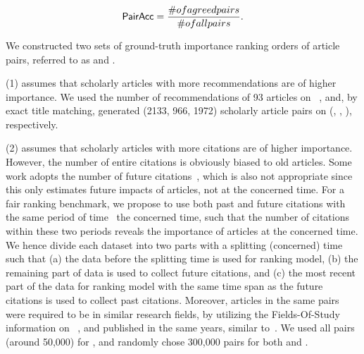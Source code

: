 \vspace{-1ex}
\begin{small}
\begin{equation}
\label{eq-metric}
\PairAcc=\frac{\#\mbox{ of agreed pairs}}{\# \mbox{ of all pairs}}.
\end{equation}
\end{small}
\vspace{-2ex}

We constructed two sets of ground-truth importance ranking orders of article pairs, referred to as  \recom and \fcita.


\noindent
(1) \recom assumes that scholarly articles with more recommendations are of higher importance.
%
We used the number of recommendations of 93 articles on \aan~\cite{Liang16AAAI}, %
and, by exact title matching, %
generated (2133, 966, 1972) scholarly article pairs on (\aan, \aminer, \magdata), respectively.


\noindent
(2) \fcita assumes that scholarly articles with more citations are of higher importance.
%
However, the number of entire citations is obviously biased to old articles. Some work adopts the number of future citations~\cite{Wang13AAAI,Wang16TIST,Li08TSRanking}, which is also not appropriate since this only estimates future impacts of articles, not at the concerned time. For a fair ranking benchmark, we propose to use both past and future citations with the same period of time \wrt\ the concerned time, such that the number of citations within these two periods reveals the importance of articles at the concerned time.
%
We hence divide each dataset into two parts with a splitting (concerned) time such that (a) the data before the splitting time is used for ranking model, (b) the remaining part of data is used to collect future citations, and (c) the most recent part of the data for ranking model with the same time span as the future citations is used to collect past citations.
%
%
Moreover, articles in the same pairs were required to be in similar research fields, by utilizing the Fields-Of-Study information on \magdata~\cite{Sinha15:MAG}, and published in the same years, similar to~\cite{Wang16TIST}.
We used all pairs (around 50,000) for \aan, and randomly chose 300,000 pairs for both \aminer and \magdata.


